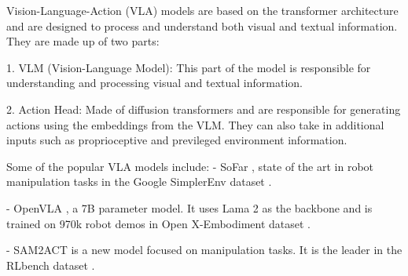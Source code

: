 Vision-Language-Action (VLA) models are based on the transformer architecture and are designed to process and understand both visual and textual information. They are made up of two parts: 

1. VLM (Vision-Language Model): This part of the model is responsible for understanding and processing visual and textual information. 

2. Action Head: Made of diffusion transformers and are responsible for generating actions using the embeddings from the VLM. They can also take in additional inputs such as proprioceptive and previleged environment information.

Some of the popular VLA models include:
- SoFar \cite{qiSoFarLanguageGroundedOrientation2025}, state of the art in robot manipulation tasks in the Google SimplerEnv dataset \cite{liEvaluatingRealWorldRobot2024}.

- OpenVLA \cite{kimOpenVLAOpenSourceVisionLanguageAction2024}, a 7B parameter model. It uses Lama 2 as the backbone and is trained on 970k robot demos in Open X-Embodiment dataset \cite{collaborationOpenXEmbodimentRobotic2024}.

- SAM2ACT \cite{fangSAM2ActIntegratingVisual2025} is a new model focused on manipulation tasks. It is the leader in the RLbench dataset \cite{jamesRLBenchRobotLearning2019a}. 